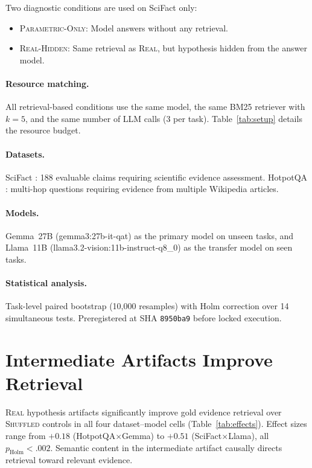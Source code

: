 \documentclass{article}
\begin{document}
Two diagnostic conditions are used on SciFact only:
\begin{itemize}
    \item \textsc{Parametric-Only}: Model answers without any retrieval.
    \item \textsc{Real-Hidden}: Same retrieval as \textsc{Real}, but hypothesis hidden from the answer model.
\end{itemize}

\paragraph{Resource matching.}
All retrieval-based conditions use the same model, the same BM25 retriever with $k=5$, and the same number of LLM calls (3 per task). Table~\ref{tab:setup} details the resource budget.

\paragraph{Datasets.}
SciFact \citep{scifact2020}: 188 evaluable claims requiring scientific evidence assessment. HotpotQA \citep{hotpotqa2018}: multi-hop questions requiring evidence from multiple Wikipedia articles.

\paragraph{Models.}
Gemma~27B (gemma3:27b-it-qat) as the primary model on unseen tasks, and Llama~11B (llama3.2-vision:11b-instruct-q8\_0) as the transfer model on seen tasks.

\paragraph{Statistical analysis.}
Task-level paired bootstrap (10{,}000 resamples) with Holm correction over 14 simultaneous tests. Preregistered at SHA \texttt{8950ba9} before locked execution.

\section{Intermediate Artifacts Improve Retrieval}
\label{sec:retrieval}

\textsc{Real} hypothesis artifacts significantly improve gold evidence retrieval over \textsc{Shuffled} controls in all four dataset--model cells (Table~\ref{tab:effects}). Effect sizes range from $+0.18$ (HotpotQA$\times$Gemma) to $+0.51$ (SciFact$\times$Llama), all $p_\text{Holm} < .002$. Semantic content in the intermediate artifact causally directs retrieval toward relevant evidence.
\end{document}
